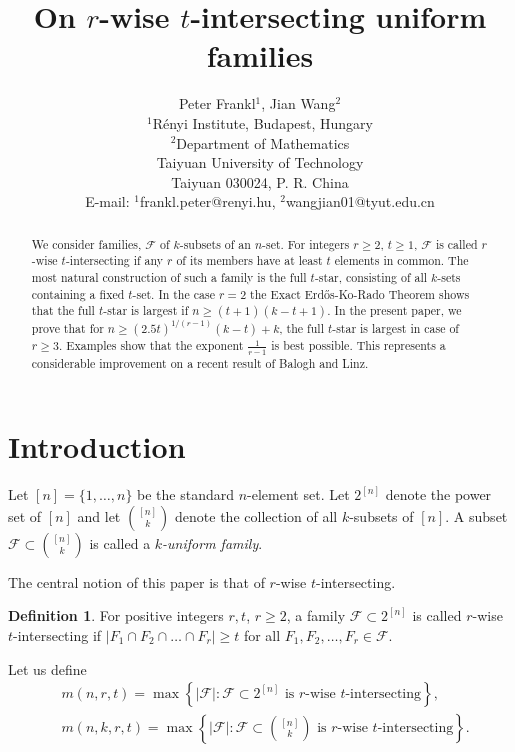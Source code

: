 \documentclass[11pt,a4paper]{article}
\newtheorem{false statement}{False statement}
\theoremstyle{definition}
\newtheorem{defn}[thm]{Definition}
\def\hf{\mathcal{F}}
\begin{document}
\title{\bf\Large On $r$-wise $t$-intersecting uniform families}
\date{}
\author{Peter Frankl$^1$, Jian Wang$^2$\\[10pt]
$^{1}$R\'{e}nyi Institute, Budapest, Hungary\\[6pt]
$^{2}$Department of Mathematics\\
Taiyuan University of Technology\\
Taiyuan 030024, P. R. China\\[6pt]
E-mail:  $^1$frankl.peter@renyi.hu, $^2$wangjian01@tyut.edu.cn
}
\maketitle

\begin{abstract}
We consider families, $\hf$ of $k$-subsets of an $n$-set. For integers $r\geq 2$, $t\geq 1$, $\hf$ is called $r$-wise $t$-intersecting if any $r$ of its members have at least $t$ elements in common. The most natural construction of such a family is the full $t$-star, consisting of all $k$-sets containing a fixed $t$-set. In the case $r=2$ the Exact Erd\H{o}s-Ko-Rado Theorem shows that the full $t$-star is largest if $n\geq (t+1)(k-t+1)$. In the present paper, we prove that for $n\geq (2.5t)^{1/(r-1)}(k-t)+k$, the full $t$-star is largest in case of $r\geq 3$. Examples show that the exponent $\frac{1}{r-1}$ is best possible. This represents a considerable improvement on a recent result of Balogh and Linz.
\end{abstract}

\section{Introduction}

Let $[n]=\{1,\ldots,n\}$ be the standard $n$-element set. Let $2^{[n]}$ denote the power set of $[n]$ and let $\binom{[n]}{k}$ denote the collection of all $k$-subsets of $[n]$. A subset $\hf\subset \binom{[n]}{k}$ is called a {\it $k$-uniform family}.

The  central notion of this paper is that of $r$-wise $t$-intersecting.

\begin{defn}
For positive integers $r,t$, $r\geq 2$, a family $\hf\subset 2^{[n]}$ is called $r$-wise $t$-intersecting if $|F_1\cap F_2\cap \ldots \cap F_r|\geq t$ for all $F_1,F_2,\ldots,F_r\in \hf$.
\end{defn}

Let us define
\begin{align*}
&m(n,r,t)= \max\left\{|\hf|\colon \hf\subset 2^{[n]} \mbox{ is $r$-wise $t$-intersecting}\right\},\\[3pt]
&m(n,k,r,t)= \max\left\{|\hf|\colon \hf\subset \binom{[n]}{k} \mbox{ is $r$-wise $t$-intersecting}\right\}.
\end{align*}
\end{document}
